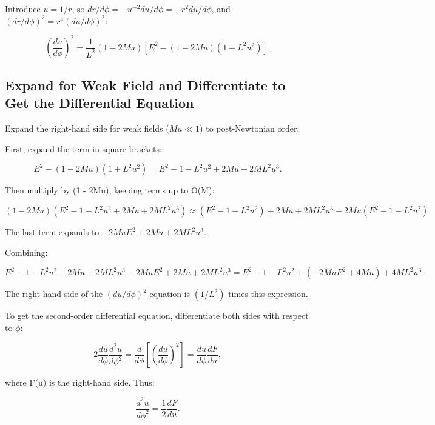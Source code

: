 \documentclass{article}
\begin{document}
Introduce \(u = 1/r\), so \( dr / d\phi = - u^{-2} du / d\phi = - r^2 du / d\phi \), and \((dr/d\phi)^2 = r^4 (du/d\phi)^2\):

\begin{equation}
 \left(\frac{du}{d\phi}\right)^2 = \frac{1}{L^2} (1 - 2Mu) \left[ E^2 - (1 - 2Mu) (1 + L^2 u^2) \right].
\end{equation}

\subsection{Expand for Weak Field and Differentiate to Get the Differential Equation}

Expand the right-hand side for weak fields (\(M u \ll 1\)) to post-Newtonian order:

First, expand the term in square brackets:

\begin{equation}
 E^2 - (1 - 2Mu) (1 + L^2 u^2) = E^2 - 1 - L^2 u^2 + 2Mu + 2M L^2 u^3.
\end{equation}

Then multiply by (1 - 2Mu), keeping terms up to O(M):

\begin{equation}
 (1 - 2Mu) (E^2 - 1 - L^2 u^2 + 2Mu + 2M L^2 u^3) \approx (E^2 - 1 - L^2 u^2) + 2Mu + 2M L^2 u^3 - 2Mu (E^2 - 1 - L^2 u^2).
\end{equation}

The last term expands to \(-2Mu E^2 + 2Mu + 2M L^2 u^3\).

Combining:

\begin{equation}
 E^2 - 1 - L^2 u^2 + 2Mu + 2M L^2 u^3 - 2Mu E^2 + 2Mu + 2M L^2 u^3 = E^2 - 1 - L^2 u^2 + (-2Mu E^2 + 4Mu) + 4M L^2 u^3.
\end{equation}

The right-hand side of the \((du/d\phi)^2\) equation is \((1/L^2)\) times this expression.

To get the second-order differential equation, differentiate both sides with respect to \(\phi\):

\begin{equation}
 2 \frac{du}{d\phi} \frac{d^2 u}{d\phi^2} = \frac{d}{d\phi} \left[ \left(\frac{du}{d\phi}\right)^2 \right] = \frac{du}{d\phi} \frac{d F}{du},
\end{equation}

where F(u) is the right-hand side. Thus:

\begin{equation}
 \frac{d^2 u}{d\phi^2} = \frac{1}{2} \frac{d F}{du}.
\end{equation}
\end{document}
